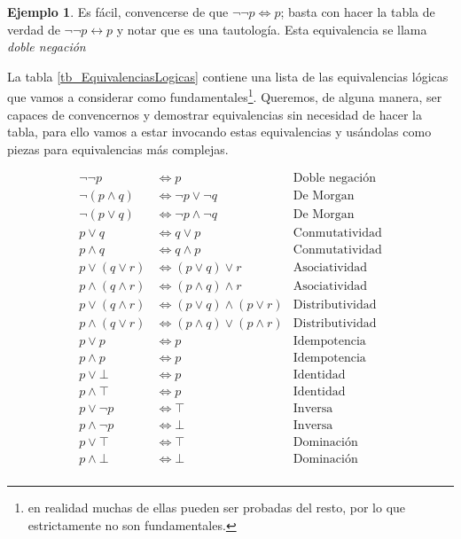 \documentclass{book}
\theoremstyle{definition}
\newtheorem{ejm}{Ejemplo}[chapter]
\begin{document}
\begin{ejm}
	Es fácil, convencerse de que $\neg \neg p \iff p$; basta con hacer la tabla de verdad de $\neg \neg p \leftrightarrow p$ y notar que es una tautología. Esta equivalencia se llama \emph{doble negación}
\end{ejm}

La tabla \ref{tb_EquivalenciasLogicas} contiene una lista de las equivalencias lógicas que vamos a considerar como fundamentales\footnote{en realidad muchas de ellas pueden ser probadas del resto, por lo que estrictamente no son fundamentales.}.
Queremos, de alguna manera, ser capaces de convencernos y demostrar equivalencias sin necesidad de hacer la tabla, para ello vamos a estar invocando estas equivalencias y usándolas como piezas para equivalencias más complejas.

\begin{table}[h]
\begin{align*}
	\neg \neg p &\iff p & \text{Doble negación}\\
	\neg(p \wedge q) &\iff \neg p \vee \neg q & \text{De Morgan}\\
	\neg(p \vee q) &\iff \neg p \wedge \neg q & \text{De Morgan}\\
	p \vee q &\iff q \vee p & \text{Conmutatividad} \\
	p \wedge q & \iff q \wedge p & \text{Conmutatividad}\\
	p \vee (q \vee r) &\iff (p \vee q) \vee r & \text{Asociatividad}\\
	p \wedge (q \wedge r) &\iff (p \wedge q) \wedge r & \text{Asociatividad}\\
	p \vee (q \wedge r) &\iff (p \vee q) \wedge (p \vee r) & \text{Distributividad} \\
	p \wedge (q \vee r) &\iff (p \wedge q) \vee (p \wedge r) & \text{Distributividad}\\
	p \vee p &\iff p & \text{Idempotencia} \\
	p \wedge p &\iff p & \text{Idempotencia}\\
	p \vee \bot &\iff p & \text{Identidad} \\
	p \wedge \top &\iff p & \text{Identidad}\\
	p \vee \neg p &\iff \top & \text{Inversa}\\
	p \wedge \neg p &\iff \bot & \text{Inversa}\\
	p \vee \top &\iff \top & \text{Dominación} \\
	p \wedge \bot &\iff \bot & \text{Dominación} \\

\end{align*}
\end{table}
\end{document}
